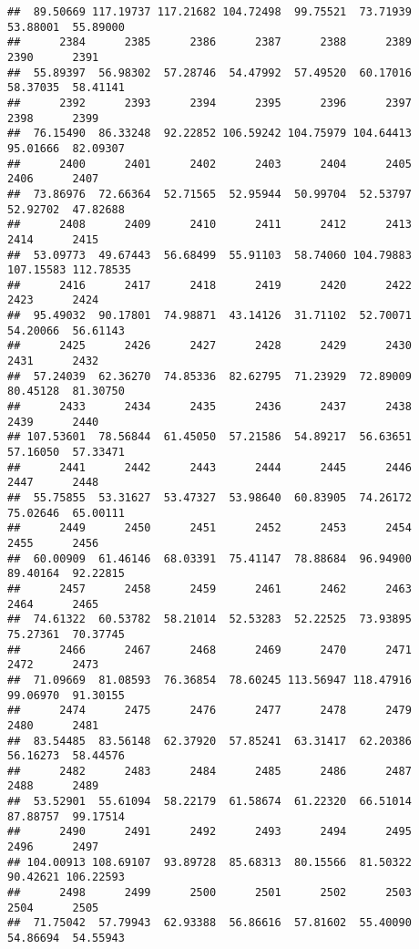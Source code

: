 \documentclass[
]{article}
\begin{document}
\begin{verbatim}
##  89.50669 117.19737 117.21682 104.72498  99.75521  73.71939  53.88001  55.89000 
##      2384      2385      2386      2387      2388      2389      2390      2391 
##  55.89397  56.98302  57.28746  54.47992  57.49520  60.17016  58.37035  58.41141 
##      2392      2393      2394      2395      2396      2397      2398      2399 
##  76.15490  86.33248  92.22852 106.59242 104.75979 104.64413  95.01666  82.09307 
##      2400      2401      2402      2403      2404      2405      2406      2407 
##  73.86976  72.66364  52.71565  52.95944  50.99704  52.53797  52.92702  47.82688 
##      2408      2409      2410      2411      2412      2413      2414      2415 
##  53.09773  49.67443  56.68499  55.91103  58.74060 104.79883 107.15583 112.78535 
##      2416      2417      2418      2419      2420      2422      2423      2424 
##  95.49032  90.17801  74.98871  43.14126  31.71102  52.70071  54.20066  56.61143 
##      2425      2426      2427      2428      2429      2430      2431      2432 
##  57.24039  62.36270  74.85336  82.62795  71.23929  72.89009  80.45128  81.30750 
##      2433      2434      2435      2436      2437      2438      2439      2440 
## 107.53601  78.56844  61.45050  57.21586  54.89217  56.63651  57.16050  57.33471 
##      2441      2442      2443      2444      2445      2446      2447      2448 
##  55.75855  53.31627  53.47327  53.98640  60.83905  74.26172  75.02646  65.00111 
##      2449      2450      2451      2452      2453      2454      2455      2456 
##  60.00909  61.46146  68.03391  75.41147  78.88684  96.94900  89.40164  92.22815 
##      2457      2458      2459      2461      2462      2463      2464      2465 
##  74.61322  60.53782  58.21014  52.53283  52.22525  73.93895  75.27361  70.37745 
##      2466      2467      2468      2469      2470      2471      2472      2473 
##  71.09669  81.08593  76.36854  78.60245 113.56947 118.47916  99.06970  91.30155 
##      2474      2475      2476      2477      2478      2479      2480      2481 
##  83.54485  83.56148  62.37920  57.85241  63.31417  62.20386  56.16273  58.44576 
##      2482      2483      2484      2485      2486      2487      2488      2489 
##  53.52901  55.61094  58.22179  61.58674  61.22320  66.51014  87.88757  99.17514 
##      2490      2491      2492      2493      2494      2495      2496      2497 
## 104.00913 108.69107  93.89728  85.68313  80.15566  81.50322  90.42621 106.22593 
##      2498      2499      2500      2501      2502      2503      2504      2505 
##  71.75042  57.79943  62.93388  56.86616  57.81602  55.40090  54.86694  54.55943 

\end{verbatim}
\end{document}
